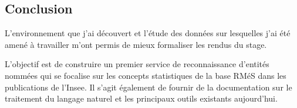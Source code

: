 \subsection*{Conclusion}
L'environnement que j'ai découvert et l'étude des données sur lesquelles j'ai été amené à travailler m'ont permis de mieux formaliser les rendus du stage.

L'objectif est de construire un premier service de reconnaissance d'entités nommées qui se focalise sur les concepts statistiques de la base RMéS dans les publications de l'Insee. Il s'agit également de fournir de la documentation sur le traitement du langage naturel et les principaux outils existants aujourd'hui.
